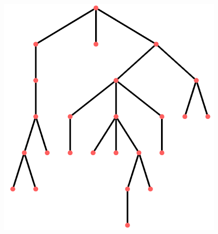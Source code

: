 \documentclass{article}
\begin{document}
\begin{figure}[h]
\begin{center}
\begin{right}
          \includegraphics[scale=0.22]{exemple1correct.png}
        \end{right}
      \end{center}
      \begin{center}
        \begin{left}

\end{left}
\end{center}
\end{figure}
\end{document}

